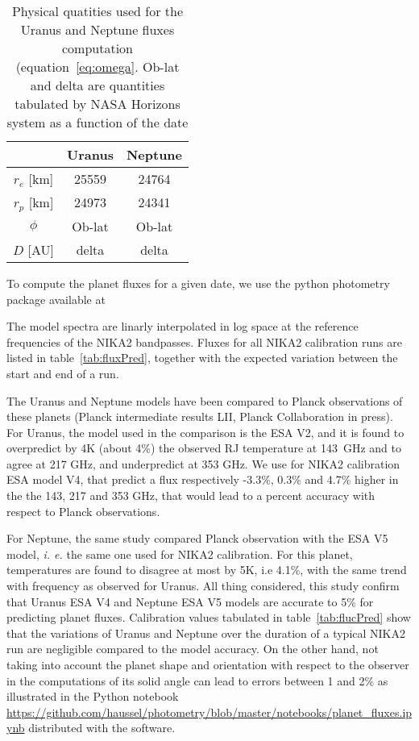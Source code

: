 \begin{table}
\begin{center}
\begin{tabular}{|c|c|c|}
\hline
     & Uranus & Neptune \\
\hline
$r_{e}$ [km]  & 25559 & 24764 \\ 
\hline
$r_{p}$ [km]  & 24973 & 24341  \\
\hline
$\phi$         & Ob-lat & Ob-lat \\
\hline
$D$   [AU]    & delta   & delta \\
\hline
\end{tabular}
\end{center}
\caption{Physical quatities used for the Uranus and Neptune fluxes
  computation (equation~\ref{eq:omega}. Ob-lat and delta are quantities 
  tabulated by NASA Horizons system \cite{NASAHorizon} as a function of the date}
\label{tab:planetphysparam}
\end{table}

To compute the planet fluxes for a given date, we use the python
photometry package available at \cite{gith-Haussel}

 
The model spectra are linarly interpolated in log space at the
reference frequencies of the NIKA2 bandpasses. Fluxes for all NIKA2
calibration runs are listed in table~\ref{tab:fluxPred}, together with
the expected variation between the start and end of a run. 

The Uranus and Neptune models have been compared to Planck
observations of these planets (Planck intermediate results LII, Planck
Collaboration in press). For Uranus, the model used in the comparison
is the ESA V2, and it is found to overpredict by 4K (about 4\%) the
observed RJ temperature at 143~GHz and to agree at 217 GHz, and
underpredict at 353 GHz. We use for NIKA2 calibration ESA model V4,
that predict a flux respectively -3.3\%, 0.3\% and 4.7\% higher in the
the 143, 217 and 353 GHz, that would lead to a percent
accuracy with respect to Planck observations. 

For Neptune, the same study compared Planck observation with the ESA V5
model, {\it i. e.} the same one used for NIKA2 calibration. For this
planet, temperatures are found to disagree at most by 5K, i.e 4.1\%,
with the same trend with frequency as observed for Uranus. All thing
considered, this study confirm that Uranus ESA V4 and Neptune ESA V5
models are accurate to 5\% for predicting planet fluxes. Calibration
values tabulated in table~\ref{tab:flucPred} show that the variations
of Uranus and Neptune over the duration of a typical NIKA2 run are
negligible compared to the model accuracy. On the other hand, not
taking into account the planet shape and orientation with respect to
the observer in the computations of its solid angle can lead to errors
between 1 and 2\% as illustrated in the Python notebook
\url{https://github.com/haussel/photometry/blob/master/notebooks/planet_fluxes.ipynb}
distributed with the software. 



